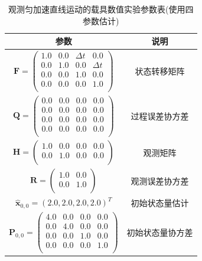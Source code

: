 \documentclass[12pt]{article}
\begin{document}
\begin{table}[htbp]
\centering
\caption{观测匀加速直线运动的载具数值实验参数表(使用四参数估计)}
\label{tab:experimaent_3_parameters_state4}
\begin{tabular}{cc} 
\hline 			
参数 & 说明  \\  
\hline 
$\bm{F} =    
   \begin{pmatrix} %
      1.0 & 0.0 & \Delta t & 0.0\\
      0.0 & 1.0 & 0.0 & \Delta t \\
      0.0 & 0.0 & 1.0 & 0.0 \\
      0.0 & 0.0 & 0.0 & 1.0 \\
   \end{pmatrix}$ & 状态转移矩阵 \\ 
$\bm{Q} =    
   \begin{pmatrix} %
      0.0 & 0.0 & 0.0 & 0.0\\
      0.0 & 0.0 & 0.0 & 0.0 \\
      0.0 & 0.0 & 0.0 & 0.0 \\
      0.0 & 0.0 & 0.0 & 0.0 \\
   \end{pmatrix}$ & 过程误差协方差 \\
$\bm{H} = 
   \begin{pmatrix} %
      1.0 & 0.0 & 0.0 & 0.0\\
      0.0 & 1.0 & 0.0 & 0.0 \\
   \end{pmatrix}$ & 观测矩阵 \\
$\bm{R} = 
   \begin{pmatrix} %
      1.0 & 0.0 \\
      0.0 & 1.0 \\
   \end{pmatrix}$ & 观测误差协方差 \\
$\hat{\bm{x}}_{0,0} = (2.0, 2.0, 2.0, 2.0)^T$ & 初始状态量估计 \\
$\bm{P}_{0,0} =  
   \begin{pmatrix} %
      4.0 & 0.0 & 0.0 & 0.0\\
      0.0 & 4.0 & 0.0 & 0.0 \\
      0.0 & 0.0 & 1.0 & 0.0 \\
      0.0 & 0.0 & 0.0 & 1.0 \\
   \end{pmatrix}$ & 初始状态量协方差 \\
\hline 
\end{tabular}
\end{table}
\end{document}
